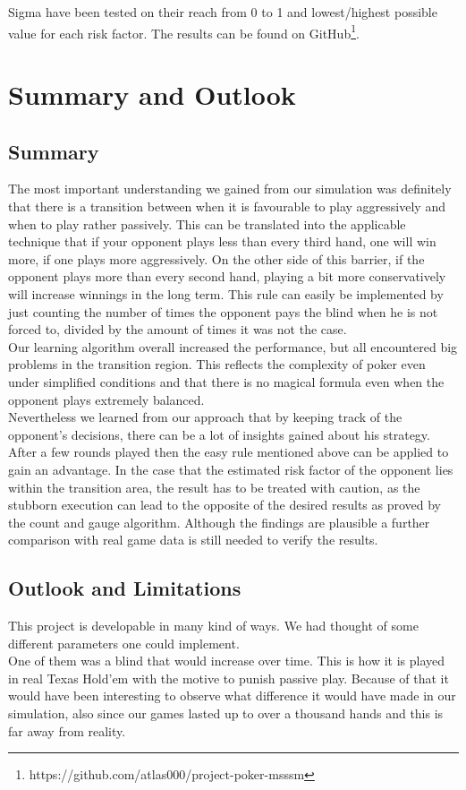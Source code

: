 \documentclass[11pt]{article}
\begin{document}
Sigma have been tested on their reach from 0 to 1 and lowest/highest possible value for each risk factor. The results can be found on GitHub\footnote{https://github.com/atlas000/project-poker-msssm}.



\section{Summary and Outlook}
\subsection{Summary}
The most important understanding we gained from our simulation was definitely that there is a transition between when it is favourable to play aggressively and when to play rather passively. This can be translated into the applicable technique that if your opponent plays less than every third hand, one will win more, if one plays more aggressively. On the other side of this barrier, if the opponent plays more than every second hand, playing a bit more conservatively will increase winnings in the long term. This rule can easily be implemented by just counting the number of times the opponent pays the blind when he is not forced to, divided by the amount of times it was not the case.\\

Our learning algorithm overall increased the performance, but all encountered big problems in the transition region. This reflects the complexity of poker even under simplified conditions and that there is no magical formula even when the opponent plays extremely balanced.\\

Nevertheless we learned from our approach that by keeping track of the opponent's decisions, there can be a lot of insights gained about his strategy. After a few rounds played then the easy rule mentioned above can be applied to gain an advantage. In the case that the estimated risk factor of the opponent lies within the transition area, the result has to be treated with caution, as the stubborn execution can lead to the opposite of the desired results as proved by the count and gauge algorithm. 
Although the findings are plausible a further comparison with real game data is still needed to verify the results.


\subsection{Outlook and Limitations}
This project is developable in many kind of ways. We had thought of some different parameters one could implement. \\
One of them was a blind that would increase over time. This is how it is played in real Texas Hold'em with the motive to punish passive play. Because of that it would have been interesting to observe what difference it would have made in our simulation, also since our games lasted up to over a thousand hands and this is far away from reality.\\
\end{document}

